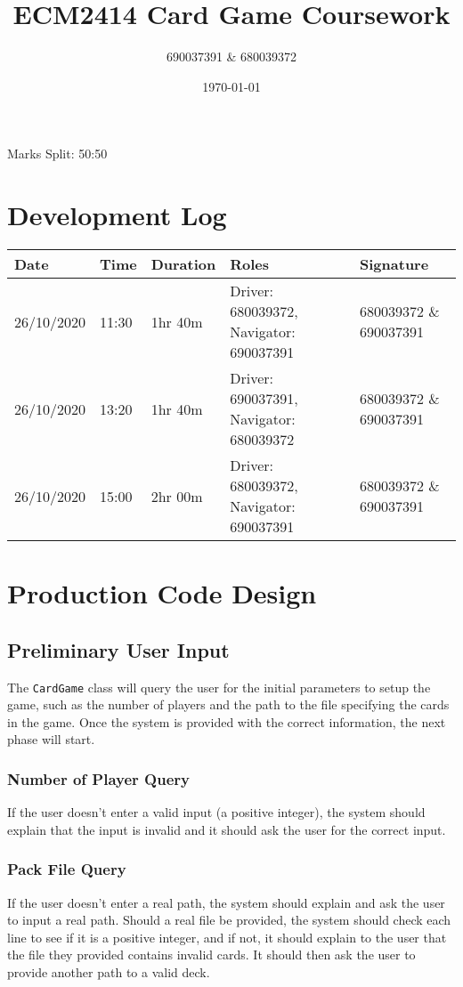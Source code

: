 \documentclass[a4paper, 11pt] {article}
\begin{document}
\title{ECM2414 Card Game Coursework}
\author{690037391 \& 680039372}
\date{\today}
\maketitle
	\begin{center}
		Marks Split: 50:50
	\end{center}
\pagebreak
\section*{Development Log}
\begin{center}
\begin{table}[H]
\begin{tabular}{|l|l|l|l|l|}
\hline
Date           & Time     & Duration  & Roles                                                 & Signature                       \\ \hline
 26/10/2020 & 11:30    & 1hr 40m  & Driver: 680039372, Navigator: 690037391 & 680039372 \& 690037391 \\ \hline
 26/10/2020 & 13:20    & 1hr 40m  & Driver: 690037391, Navigator: 680039372 & 680039372 \& 690037391 \\ \hline
 26/10/2020 & 15:00    & 2hr 00m & Driver: 680039372, Navigator: 690037391 & 680039372 \& 690037391 \\ \hline
\end{tabular}
\end{table}
\end{center}
\FloatBarrier
\section*{Production Code Design}
\subsection*{Preliminary User Input}
The \texttt{CardGame} class will query the user for the initial parameters to setup the game, such as the number of players and the path to the file specifying the cards in the game. Once the system is provided with the correct information, the next phase will start.
\subsubsection*{Number of Player Query}
If the user doesn't enter a valid input (a positive integer), the system should explain that the input is invalid and it should ask the user for the correct input.
\subsubsection*{Pack File Query}
If the user doesn't enter a real path, the system should explain and ask the user to input a real path.
Should a real file be provided, the system should check each line to see if it is a positive integer, and if not, it should explain to the user that the file they provided contains invalid cards. It should then ask the user to provide another path to a valid deck.
\end{document}
